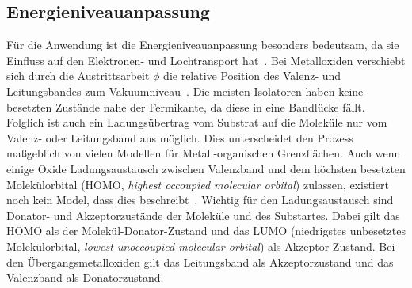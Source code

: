         \subsection{Energieniveauanpassung} \label{sec:ENA}
            Für die Anwendung ist die Energieniveauanpassung besonders bedeutsam, da sie Einfluss auf den Elektronen- und Lochtransport hat~\cite{IF_4}.
            Bei Metalloxiden verschiebt sich durch die Austrittsarbeit $\phi$ die relative Position des Valenz- und Leitungsbandes zum Vakuumniveau~\cite{IF_3}.
            Die meisten Isolatoren haben keine besetzten Zustände nahe der Fermikante, da diese in eine Bandlücke fällt.
            Folglich ist auch ein Ladungsübertrag vom Substrat auf die Moleküle nur vom Valenz- oder Leitungsband aus möglich.
            Dies unterscheidet den Prozess maßgeblich von vielen Modellen für Metall-organischen Grenzflächen.
            Auch wenn einige Oxide Ladungsaustausch zwischen Valenzband und dem höchsten besetzten Molekülorbital (HOMO, \textit{highest occoupied molecular orbital}) zulassen, existiert noch kein Model, dass dies beschreibt~\cite{IF_3}.
            Wichtig für den Ladungsaustausch sind Donator- und Akzeptorzustände der Moleküle und des Substartes.
            Dabei gilt das HOMO als der Molekül-Donator-Zustand und das LUMO (niedrigstes unbesetztes Molekülorbital, \textit{lowest unoccoupied molecular orbital}) als Akzeptor-Zustand.
            Bei den Übergangsmetalloxiden gilt das Leitungsband als Akzeptorzustand und das Valenzband als Donatorzustand. 
            
